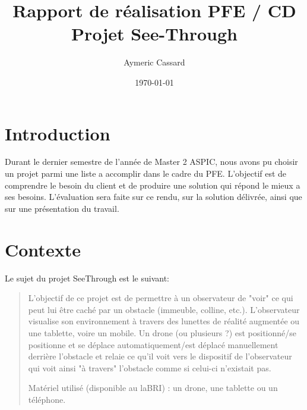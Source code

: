 \documentclass{article}
\title{Rapport de réalisation PFE / CD \\
Projet See-Through}
\author{Aymeric Cassard}
\date{\today}
\begin{document}
\renewcommand{\refname}{R\'ef\'erences}
\renewcommand{\contentsname}{Table des matières}

\maketitle
\newpage


\tableofcontents
\newpage



\section*{Introduction}
Durant le dernier semestre de l'ann\'ee de Master 2 ASPIC, nous avons pu choisir un projet parmi une liste a accomplir dans le cadre du PFE. L'objectif est de comprendre le besoin du client et de produire une solution qui r\'epond le mieux a ses besoins.
L'\'evaluation sera faite sur ce rendu, sur la solution d\'elivr\'ee, ainsi que sur une pr\'esentation du travail.

\section*{Contexte}
Le sujet du projet SeeThrough est le suivant:
\begin{quote}
L'objectif de ce projet est de permettre à un observateur de "voir" ce qui peut
lui être caché par un obstacle (immeuble, colline, etc.). L'observateur
visualise son environnement à travers des lunettes de réalité augmentée ou une
tablette, voire un mobile. Un drone (ou plusieurs ?) est positionné/se
positionne et se déplace automatiquement/est déplacé manuellement derrière
l'obstacle et relaie ce qu'il voit vers le dispositif de l'observateur qui voit
ainsi "à travers" l'obstacle comme si celui-ci n'existait pas.

Matériel utilisé (disponible au laBRI) : un drone, une tablette ou un téléphone.
\end{quote}
\end{document}
